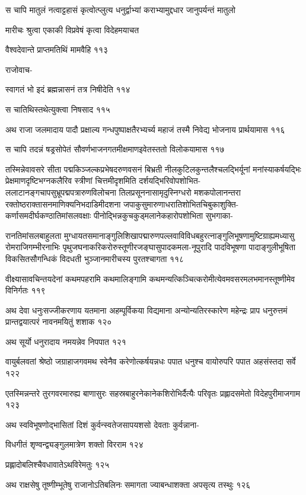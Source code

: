 स चापि मातुलं नत्वाट्टहासं कृत्वोत्प्लुत्य धनुर्द्वाभ्यां कराभ्यामुद्दधार जानुपर्यन्तं मातुलो

मारीचः श्रुत्वा एकाकी विप्रवेषं कृत्वा विदेहमयाचत

वैश्वदेवान्ते प्राप्तमतिथिं मामवैहि ११३

राजोवाच-

स्वागतं भो इदं ब्रह्मन्नासनं तत्र निषीदेति ११४

स चातिथिस्तथेत्युक्त्वा निषसाद ११५

अथ राजा जलमादाय पादौ प्रक्षाल्य गन्धपुष्पाक्षतैरभ्यर्च्य महाजं तस्मै निवेद्य भोजनाय
प्रार्थयामास ११६

स चापि तदन्नं षड्रसोपेतं सौवर्णभाजनगतमीक्षमाणइवेतस्ततो विलोकयामास ११७

तस्मिन्नेवावसरे सीता पद्मकिञ्जल्कप्रभेषदरुणवसनं बिभ्रती नीलकुटिलकुन्तलैश्चलद्भिर्यूनां
मनांस्याकर्षयद्भिः प्रेक्षमाणदृष्टिभग्नकलैरिव स्त्रीणां चित्तमीदृशमिति
दर्शयद्भिरिवोपशोभित-ललाटानङ्गचापसुभ्रूपद्मपत्रारुणविलोचना तिलप्रसूननासामृदुस्निग्धरो
मशकपोलानन्तरा रक्तोष्ठराक्तासनमाणिक्यनिभदाडिमीदशना
जपाकुसुमारुणाधरातिशोभितचिबुकाशुक्ति-कर्णासमदीर्घकण्ठातिमांसलवक्षाः
पीनोद्भिन्नकुचकुड्मलानेकहारोपशोभिता सुभगाका-

रानतिमांसलबाहुलता
मुग्धायतसमानाङ्गुलिशिखापद्मारुणपल्लवाविविधबहुरत्नाङ्गुलिभूषणामुष्टिग्राह्यमध्यासु
रोमराजिगम्भीरनाभिः पृथुजघनाकरिकरोरुस्तूणीरजङ्घासुपादकमला-नूपुरादि पादविभूषणा
पादाङ्गुलीभूषिता विकसितसौगन्धिकं विदधती भुञ्जानमारीचस्य पुरतश्चागता ११८

वीक्ष्यासावचिन्तयदेनां कथमपहरामि कथमालिङ्गामि
कथमन्यत्किञ्चित्करोमीत्येवमवसरमलभमानस्तूष्णीमेव विनिर्गतः ११९

अथ देवा धनुःसज्जीकरणाय यतमाना अहम्पूर्विकया विद्यमाना अन्योन्यतिरस्कारेण महेन्द्रः प्राप
धनुरुत्तमं प्रान्तद्वयात्परं नावनमयितुं शशाक १२०

अथ सूर्यो धनुरादाय नमयन्नेव निपपात १२१

वायुर्बलवतां श्रेष्ठो जग्राहाजगवमथ स्वेनैव करेणोत्कर्षयन्नधः पपात धनुश्च वायोरुपरि पपात
अहसंस्तदा सर्वे १२२

एतस्मिन्नन्तरे तुरगवरमारुह्य बाणासुरः सहस्रबाहुरनेकानेकशिरोभिर्दैत्यैः परिवृतः प्रह्लादसमेतो
विदेहपुरीमाजगाम १२३

अथ स्वविभूषणोद्भासितां दिशं कुर्वन्स्वतेजसापयशसो देवताः कुर्वन्नाना-

विधगीतं शृण्वन्द्व्यङ्गुलमात्रेण शक्तो विरराम १२४

प्रह्लादोबलिश्चैवधावातेऽथविरेमतुः १२५

अथ राक्षसेषु तूष्णीम्भूतेषु राजानोऽतिबलिनः समागता ज्याबन्धाशक्ता अपसृत्य तस्थुः १२६

